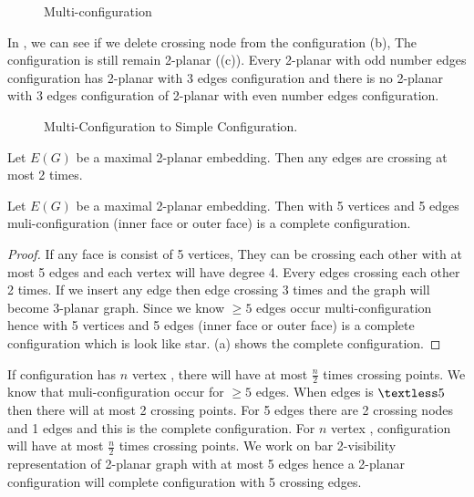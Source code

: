 \begin{figure}[!tb]
\centering
\resizebox{100mm}{!}{}
\caption{Multi-configuration}
\label{fig:multiconfiguration}
\end{figure}

In , we can see if we delete crossing node from the configuration (b), The configuration is still remain 2-planar ((c)). 
Every 2-planar with odd number edges configuration has 2-planar with 3 edges configuration and there is no 2-planar with 3 edges configuration of 2-planar with even number edges configuration.
\begin{figure}[!tb]
\centering
\resizebox{100mm}{!}{}
\caption{Multi-Configuration to Simple Configuration.}
\label{fig:starmulti}
\end{figure}


\begin{lemma}

Let $E(G)$ be a maximal 2-planar embedding. Then any edges are crossing at most 2 times. 

\end{lemma}

\begin{lemma}

Let $E(G)$ be a maximal 2-planar embedding. Then with 5 vertices and 5 edges muli-configuration (inner face or outer face) is a complete configuration. 
\end{lemma}

\begin{proof}

If any face is consist of 5 vertices, They can be crossing each other with at most 5 edges and each vertex will have degree 4. Every edges crossing each other 2 times. If we insert any edge then edge crossing 3 times and the graph will become 3-planar graph. Since we know $\geq 5$ edges occur multi-configuration hence with 5 vertices and 5 edges (inner face or outer face) is a complete configuration which is look like star. (a) shows the complete configuration.
\end{proof}

If configuration has $n$ vertex , there will have at most $\frac{n}{2}$ times crossing points.
We know that muli-configuration occur for $\geq 5$ edges. When edges is $ \textless 5$ then there will at most 2 crossing points. For 5 edges there are 2 crossing nodes and 1 edges and this is the complete configuration. For $n$ vertex , configuration will have at most $\frac{n}{2}$ times crossing points. We work on bar 2-visibility representation of 2-planar graph with at most 5 edges hence a 2-planar configuration will complete configuration with 5 crossing edges.





